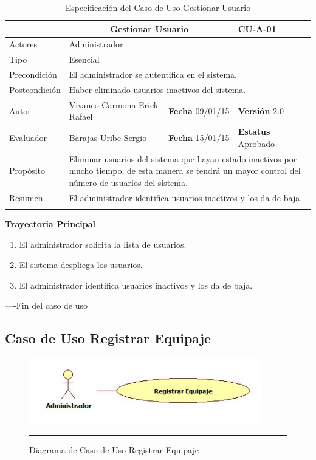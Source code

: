 \begin{longtable}{|p{2.5cm}|p{6.4cm}|p{2cm}|p{2cm}|}
	\hline
		\rowcolor[RGB]{255,102,102}{Caso de Uso}&\multicolumn{2}{c}{Gestionar Usuario}&{\textbf{CU-A-01}}\\
	\hline
		{Actores}&\multicolumn{3}{p{11.2cm}|}{Administrador}\\
	\hline
		{Tipo}&\multicolumn{3}{p{11.2cm}|}{Esencial}\\
	\hline
		{Precondición}&\multicolumn{3}{p{11.2cm}|}{El administrador se autentifica en el sistema.}\\
	\hline
		{Postcondición}&\multicolumn{3}{p{11.2cm}|}{Haber eliminado usuarios inactivos del sistema.}\\
	\hline
		{Autor}&{Vivanco Carmona Erick Rafael}&{\textbf{Fecha} 09/01/15}&{\textbf{Versión} 2.0}\\
			\hline
		{Evaluador}&{Barajas Uribe Sergio}&{\textbf{Fecha} 15/01/15}&{\textbf{Estatus} Aprobado}\\
	\hline
		{Propósito}&\multicolumn{3}{p{11.2cm}|}{Eliminar usuarios del sistema que hayan estado inactivos por mucho tiempo, de esta manera se tendrá un mayor control del número de usuarios del sistema.}\\
	\hline
		{Resumen}&\multicolumn{3}{p{11.2cm}|}{El administrador identifica usuarios inactivos y los da de baja.}\\	
	\hline
	\caption[Especificación del Caso de Uso Gestionar Usuario]{Especificación del Caso de Uso Gestionar Usuario}
    	\label{tab:cuGestionarUsuario}
\end{longtable}

\begin{flushleft}
	\textbf{Trayectoria Principal}\\
	\begin{enumerate}
		\item El administrador solicita la lista de usuarios.
		\item El sistema despliega los usuarios.
		\item El administrador identifica usuarios inactivos y los da de baja.
	\end{enumerate}
\end{flushleft}
----Fin del caso de uso

\subsection{Caso de Uso Registrar Equipaje}

\begin{figure}[htbp]
	\centering
		\includegraphics[width=0.9\textwidth]{Figuras/cuRegistrarEquipaje.png}
		\rule{30em}{0.5pt}
	\caption[Diagrama de Caso de Uso Registrar Equipaje]{Diagrama de Caso de Uso Registrar Equipaje}
	\label{fig:cuRegistrarEquipaje}
\end{figure}

